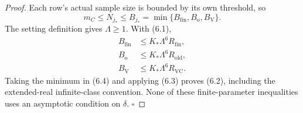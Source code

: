 \begin{proof}
Each row's actual sample size is bounded by its own threshold, so
\[
m_C\le N_{j_*}\le B_{j_*}
=\min\{B_{\mathrm{fin}},B_{\mathrm o},B_{\mathrm V}\}.
\tag{6.3}
\]
The setting definition gives \(\Lambda\ge1\). With (6.1),
\[
\begin{aligned}
B_{\mathrm{fin}}&\le K_*\Lambda^6R_{\mathrm{fin}},\\
B_{\mathrm o}&\le K_*\Lambda^6R_{\mathrm{old}},\\
B_{\mathrm V}&\le K_*\Lambda^6R_{\mathrm{VC}}.
\end{aligned}
\tag{6.4}
\]
Taking the minimum in (6.4) and applying (6.3) proves (6.2), including the
extended-real infinite-class convention. None of these finite-parameter
inequalities uses an asymptotic condition on \(\delta\). \(\square\)


\end{proof}

